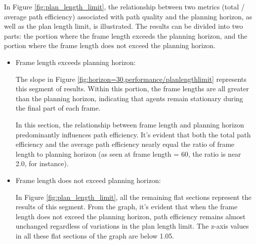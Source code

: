 \FloatBarrier

In Figure \ref{fig:plan_length_limit}, the relationship between two metrics (total / average path efficiency) associated with path quality and the planning horizon, as well as the plan length limit, is illustrated.
The results can be divided into two parts: the portion where the frame length exceeds the planning horizon, and the portion where the frame length does not exceed the planning horizon.

\begin{itemize}
    \item Frame length exceeds planning horizon: 
    
    The slope in Figure \ref{fig:horizon=30,performance/planlengthlimit} represents this segment of results. Within this portion, the frame lengths are all greater than the planning horizon, indicating that agents remain stationary during the final part of each frame.

    In this section, the relationship between frame length and planning horizon predominantly influences path efficiency. It's evident that both the total path efficiency and the average path efficiency nearly equal the ratio of frame length to planning horizon (as seen at frame length = 60, the ratio is near 2.0, for instance).

    \item Frame length does not exceed planning horizon: 
    
    In Figure \ref{fig:plan_length_limit}, all the remaining flat sections represent the results of this segment. From the graph, it's evident that when the frame length does not exceed the planning horizon, path efficiency remains almost unchanged regardless of variations in the plan length limit. The z-axis values in all these flat sections of the graph are below 1.05.
    

\end{itemize}

